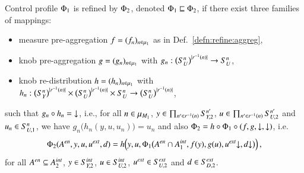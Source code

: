 \documentclass[runningheads]{llncs}
\makeatletter
\newcommand{\defn}[1]{Def.~\ref{defn:#1}}
\newcommand{\ie}[1][\@ ]{i.e.{#1}}
\newcommand{\abstracts}[1][]{\sqsubseteq\ifx#1\relax\else^{#1}\fi}
\newcommand{\isrefinedby}{\abstracts}
\newcommand{\motif}[1][]{M\ifx#1\relax\else^{#1}\fi}
\newcommand{\map}[1][]{\mu\ifx#1\relax\else^{#1}\fi}
\newcommand{\actions}[1][]{A\ifx\relax#1\relax\else^{#1}\fi}
\newcommand{\measure}[1][]{y\ifx#1\relax\else^{#1}\fi}
\newcommand{\measurerange}[1][]{Y\ifx#1\relax\else^{#1}\fi}
\newcommand{\knob}[1][]{u\ifx#1\relax\else^{#1}\fi}
\newcommand{\knobrange}[1][]{U\ifx#1\relax\else^{#1}\fi}
\newcommand{\disturbance}[1][]{d\ifx#1\relax\else^{#1}\fi}
\newcommand{\disturbancerange}[1][]{D\ifx#1\relax\else^{#1}\fi}
\newcommand{\profile}[1][]{\Phi\ifx#1\relax\else^{#1}\fi}
\newcommand{\project}[3][]{{#2}{\downarrow}\ifx#1\relax\else_{#3}\fi}
\newcommand{\vectorspace}[1][]{S\ifx#1\relax\else^{#1}\fi}
\newcommand{\external}[2][]{\ifx\relax#2\relax#1\mathit{ext}\else#2[#1\mathit{ext}]\fi}
\newcommand{\internal}[2][]{#2[#1\mathit{int}]}
\newcommand{\enabled}[2][]{{#2[\mathit{en}]\ifx#1\relax\else_{#1}\fi}}
\makeatother
\begin{document}
\begin{definition}
  \label{defn:refine:profile}
  Control profile $\profile_1$ is refined by $\profile_2$, denoted $\profile_1 \isrefinedby \profile_2$, if there exist three families of mappings:
%
  \begin{itemize}

  \item measure pre-aggregation $f = (f_n)_{n \in \map_1}$ %
    as in \defn{refine:aggreg},%

  \item knob pre-aggregation $g = (g_n)_{n \in \map_1}$ with
    $
    g_n: \bigl(\vectorspace[n]_{\knobrange}\bigr)^{|r^{-1}(n)|} \rightarrow \vectorspace[n]_{\knobrange}
    $,%

  \item knob re-distribution $h = (h_n)_{n \in \map_1}$ with
    $
    h_n: \bigl(\vectorspace[n]_{\measurerange}\bigr)^{|r^{-1}(n)|} \times  \bigl(\vectorspace[n]_{\knobrange}\bigr)^{|r^{-1}(n)|} \times \vectorspace[n]_{\knobrange} \rightarrow \bigl(\vectorspace[n]_{\knobrange}\bigr)^{|r^{-1}(n)|}
    $,%
    
  \end{itemize}
%
  such that $g_n \circ h_n = \project{}{3}$, \ie[], for all $n \in \map_{\motif_1}$, $y \in \prod_{n' \in r^{-1}(n)}\vectorspace[n']_{\measurerange,2}$, $u \in \prod_{n' \in r^{-1}(n)} \vectorspace[n']_{\knobrange,2}$ and $u_n \in \vectorspace[n]_{\knobrange,1}$, we have
  $g_n\bigl(h_n (y,u,u_n)\bigr) = u_n$
  and also $\profile_2 = h \circ \profile_1 \circ (f, g, \project{}{\external{\vectorspace}_{\knobrange,1}}, \project{}{\external{\vectorspace}_{\disturbancerange,1}})$, \ie
    \begin{equation}
    \label{eq:profile-reft}
      \profile_2(
      \enabled{\actions},
      \measure,
      \knob,
      \external{\knob},
      \disturbance
      )
      =
      h\Big(
      \measure,
      \knob,
      \profile_1\bigl(
      \enabled{\actions} \cap \internal{\actions}_{1},
      f(\measure),
      g(\knob),
      \project{\external{\knob}}{\external{\vectorspace}_{\knobrange_1}},
      \project{\disturbance}{\external{\vectorspace}_{\disturbancerange,1}}
      \bigr)
      \Big)
      \,,
    \end{equation}
    for all $\enabled{\actions} \subseteq \internal{\actions}_{2}$, $\measure \in \internal{\vectorspace}_{\measurerange,2}$, $\knob \in \internal{\vectorspace}_{\knobrange,2}$, $\external{\knob} \in \external{\vectorspace}_{\knobrange,2}$ and $\disturbance \in \external{\vectorspace}_{\disturbancerange,2}$.
\end{definition}
\end{document}
